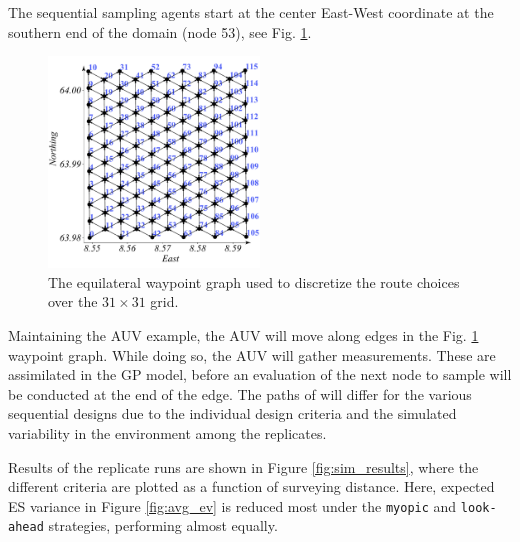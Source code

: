 \documentclass[aoas]{imsart}
\begin{document}
The sequential sampling agents start at the center East-West coordinate at the southern end of the domain (node 53), see Fig. \ref{fig:wp_graph}.

\begin{figure}[h]
\centering
\includegraphics[width=0.50\textwidth]{Figures/sim/wp_graph_paper.pdf}
\caption{The equilateral waypoint graph used to discretize the route choices over the $31\times31$ grid.}
\label{fig:wp_graph}
\end{figure}

Maintaining the AUV example, the AUV will move along edges in the Fig. \ref{fig:wp_graph} waypoint graph. While doing so, the AUV will gather measurements. These are assimilated in the GP model, before an evaluation of the next node to sample will be conducted at the end of the edge. The paths of will differ for the various sequential designs due to the individual design criteria and the simulated variability in the environment among the replicates.

Results of the replicate runs are shown in Figure \ref{fig:sim_results},
where the different criteria are plotted as a function of surveying
distance. Here, expected ES variance in Figure \ref{fig:avg_ev} is
reduced most under the \texttt{myopic} and \texttt{look-ahead}
strategies, performing almost equally.
\end{document}
